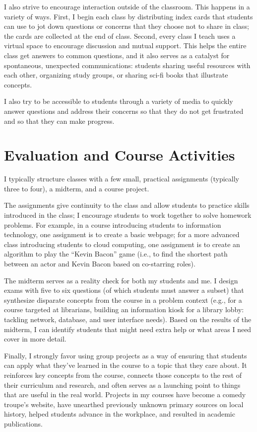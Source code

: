 \documentclass[11pt]{amsart}
\begin{document}
I also strive to encourage interaction outside of the classroom.  This
happens in a variety of ways.  First, I begin each class by
distributing index cards that students can use to jot down questions
or concerns that they choose not to share in class; the cards are
collected at the end of class.  Second, every class I teach uses a
virtual space to encourage discussion and mutual support.  This helps
the entire class get answers to common questions, and it also serves
as a catalyst for spontaneous, unexpected communications: students
sharing useful resources with each other, organizing study groups, or
sharing sci-fi books that illustrate concepts.

I also try to be accessible to students through a variety of media to quickly
answer questions and address their concerns so that they do not get frustrated
and so that they can make progress.

\section{Evaluation and Course Activities}

I typically structure classes with a few small, practical assignments (typically
three to four), a midterm, and a course project.

The assignments give continuity to the class and allow students to practice
skills introduced in the class; I encourage students to work together to solve
homework problems.  For example, in a course introducing students to information
technology, one assignment is to create a basic webpage; for a more advanced
class introducing students to cloud computing, one assignment is to create an
algorithm to play the ``Kevin Bacon'' game (i.e., to find the shortest path
between an actor and Kevin Bacon based on co-starring roles).

The midterm serves as a reality check for both my students and me.  I design
exams with five to six questions (of which students must answer a subset) that
synthesize disparate concepts from the course in a problem context (e.g., for a
course targeted at librarians, building an information kiosk for a library
lobby: tackling network, database, and user interface needs).  Based on the
results of the midterm, I can identify students that might need extra help or
what areas I need cover in more detail.

Finally, I strongly favor using group projects as a way of ensuring that
students can apply what they've learned in the course to a topic that they care
about.  It reinforces key concepts from the course, connects those concepts to
the rest of their curriculum and research, and often serves as a launching point
to things that are useful in the real world.  Projects in my courses have become
a comedy troupe's website, have unearthed previously unknown primary sources on
local history, helped students advance in the workplace, and resulted in
academic publications.
\end{document}
